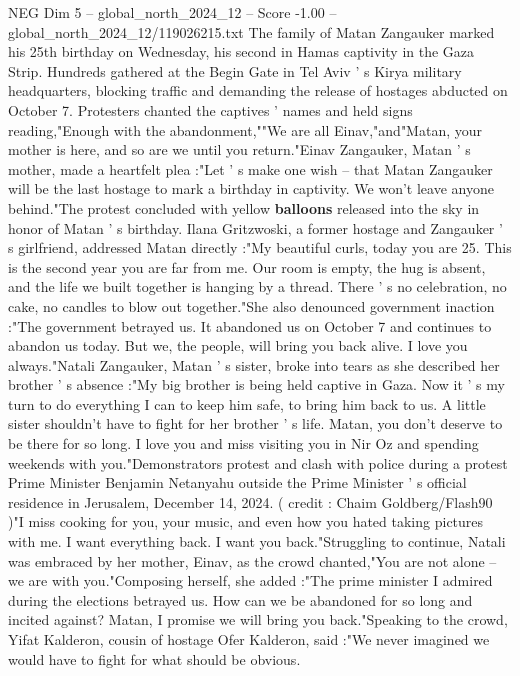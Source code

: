 \begin{textsample}{NEG Dim 5 – global\_north\_2024\_12 – Score -1.00 – global\_north\_2024\_12/119026215.txt}  \label{ex:f5_neg_333}
The family of Matan Zangauker marked his 25th birthday on Wednesday, his second in Hamas captivity in the Gaza Strip.
Hundreds gathered at the Begin Gate in Tel Aviv ' s Kirya military headquarters, blocking traffic and demanding the release of hostages abducted on October 7.
Protesters chanted the captives ' names and held signs reading,"Enough with the abandonment,""We are all Einav,"and"Matan, your mother is here, and so are we until you return."Einav Zangauker, Matan ' s mother, made a heartfelt plea :"Let ' s make one wish -- that Matan Zangauker will be the last hostage to mark a birthday in captivity.
We won't leave anyone behind."The protest concluded with yellow \textbf{balloons} released into the sky in honor of Matan ' s birthday.
Ilana Gritzwoski, a former hostage and Zangauker ' s girlfriend, addressed Matan directly :"My beautiful curls, today you are 25.
This is the second year you are far from me.
Our room is empty, the hug is absent, and the life we built together is hanging by a thread.
There ' s no celebration, no cake, no candles to blow out together."She also denounced government inaction :"The government betrayed us.
It abandoned us on October 7 and continues to abandon us today.
But we, the people, will bring you back alive.
I love you always."Natali Zangauker, Matan ' s sister, broke into tears as she described her brother ' s absence :"My big brother is being held captive in Gaza.
Now it ' s my turn to do everything I can to keep him safe, to bring him back to us.
A little sister shouldn't have to fight for her brother ' s life.
Matan, you don't deserve to be there for so long.
I love you and miss visiting you in Nir Oz and spending weekends with you."Demonstrators protest and clash with police during a protest Prime Minister Benjamin Netanyahu outside the Prime Minister ' s official residence in Jerusalem, December 14, 2024. ( credit : Chaim Goldberg/Flash90 )"I miss cooking for you, your music, and even how you hated taking pictures with me.
I want everything back.
I want you back."Struggling to continue, Natali was embraced by her mother, Einav, as the crowd chanted,"You are not alone -- we are with you."Composing herself, she added :"The prime minister I admired during the elections betrayed us.
How can we be abandoned for so long and incited against?
Matan, I promise we will bring you back."Speaking to the crowd, Yifat Kalderon, cousin of hostage Ofer Kalderon, said :"We never imagined we would have to fight for what should be obvious.

\end{textsample}
